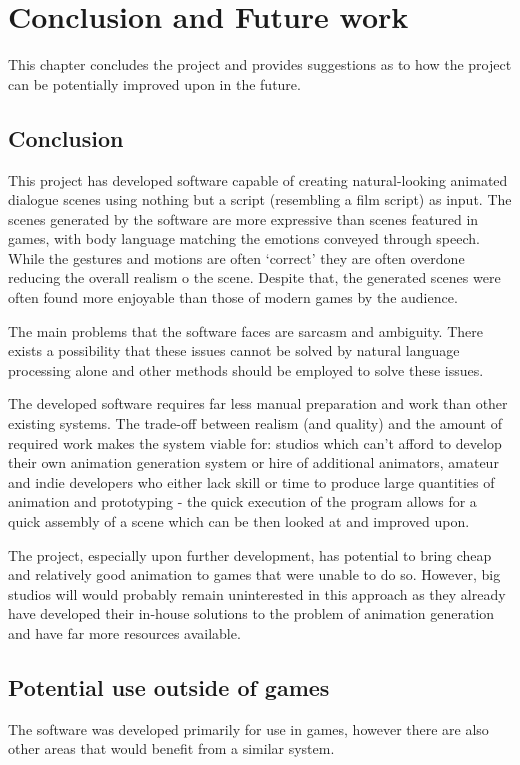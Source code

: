 \chapter{Conclusion and Future work \label{chap:conclusion}}
This chapter concludes the project and provides suggestions as to how the project can be potentially improved upon in the future.

\section{Conclusion}
This project has developed software capable of creating natural-looking animated dialogue scenes using nothing but a script (resembling a film script) as input. The scenes generated by the software are more expressive than scenes featured in games, with body language matching the emotions conveyed through speech. While the gestures and motions are often `correct' they are often overdone reducing the overall realism o the scene. Despite that, the generated scenes were often found more enjoyable than those of modern games by the audience.

The main problems that the software faces are sarcasm and ambiguity. There exists a possibility that these issues cannot be solved by natural language processing alone and other methods should be employed to solve these issues.

The developed software requires far less manual preparation and work than other existing systems. The trade-off between realism (and quality) and the amount of required work makes the system viable for: studios which can't afford to develop their own animation generation system or hire of additional animators, amateur and indie developers who either lack skill or time to produce large quantities of animation and prototyping - the quick execution of the program allows for a quick assembly of a scene which can be then looked at and improved upon.

The project, especially upon further development, has potential to bring cheap and relatively good animation to games that were unable to do so. However, big studios will would probably remain uninterested in this approach as they already have developed their in-house solutions to the problem of animation generation and have far more resources available.

\section{Potential use outside of games}
The software was developed primarily for use in games, however there are also other areas that would benefit from a similar system. 


